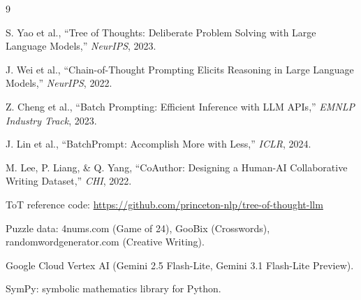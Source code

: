 \documentclass[11pt]{article}
\begin{document}
\clearpage
\begin{thebibliography}{9}

S. Yao et al., ``Tree of Thoughts: Deliberate Problem Solving with Large Language Models,'' \textit{NeurIPS}, 2023.

J. Wei et al., ``Chain-of-Thought Prompting Elicits Reasoning in Large Language Models,'' \textit{NeurIPS}, 2022.

Z. Cheng et al., ``Batch Prompting: Efficient Inference with LLM APIs,'' \textit{EMNLP Industry Track}, 2023.

J. Lin et al., ``BatchPrompt: Accomplish More with Less,'' \textit{ICLR}, 2024.

M. Lee, P. Liang, \& Q. Yang, ``CoAuthor: Designing a Human-AI Collaborative Writing Dataset,'' \textit{CHI}, 2022.

ToT reference code: \url{https://github.com/princeton-nlp/tree-of-thought-llm}

Puzzle data: 4nums.com (Game of 24), GooBix (Crosswords), randomwordgenerator.com (Creative Writing).

Google Cloud Vertex AI (Gemini 2.5 Flash-Lite, Gemini 3.1 Flash-Lite Preview).

SymPy: symbolic mathematics library for Python.

\end{thebibliography}
\end{document}
